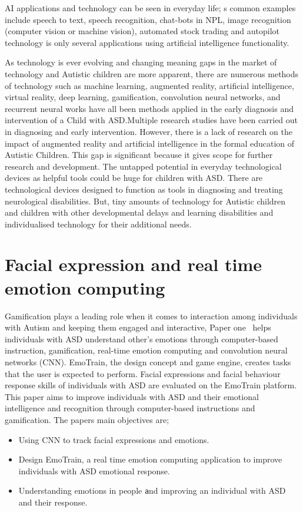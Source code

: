 AI applications and technology can be seen in everyday life; s common examples include speech to text, speech recognition, chat-bots in NPL, image recognition (computer vision or machine vision), automated stock trading and autopilot technology is only several applications using artificial intelligence functionality. 

As technology is ever evolving and changing meaning gaps in the market of technology and Autistic children are more apparent, there are numerous methods of technology such as machine learning, augmented reality, artificial intelligence, virtual reality, deep learning, gamification, convolution neural networks, and recurrent neural works have all been methods applied in the early diagnosis and intervention of a Child with ASD.Multiple research studies have been carried out in diagnosing and early intervention. However, there is a lack of research on the impact of augmented reality and artificial intelligence in the formal education of Autistic Children. This gap is significant because it gives scope for further research and development. The untapped potential in everyday technological devices as helpful tools could be huge for children with ASD. There are technological devices designed to function as tools in diagnosing and treating neurological disabilities. But, tiny amounts of technology for Autistic children and children with other developmental delays and learning disabilities and individualised technology for their additional needs.

\section{Facial expression and real time emotion computing}

Gamification plays a leading role when it comes to interaction among individuals with Autism and keeping them engaged and interactive, Paper one~\cite{Reference19} helps individuals with ASD understand other's emotions through computer-based instruction, gamification, real-time emotion computing and convolution neural networks (CNN). EmoTrain, the design concept and game engine, creates tasks that the user is expected to perform. Facial expressions and facial behaviour response skills of individuals with ASD are evaluated on the EmoTrain platform. This paper aims to improve individuals with ASD and their emotional intelligence and recognition through computer-based instructions and gamification. The papers main objectives are;

\begin{itemize}
    \item Using CNN to track facial expressions and emotions.
    \item Design EmoTrain, a real time emotion computing application to improve individuals with ASD emotional response.
    \item Understanding emotions in people 
    \texttt and improving an individual with 
    ASD and their response.
\end{itemize}

